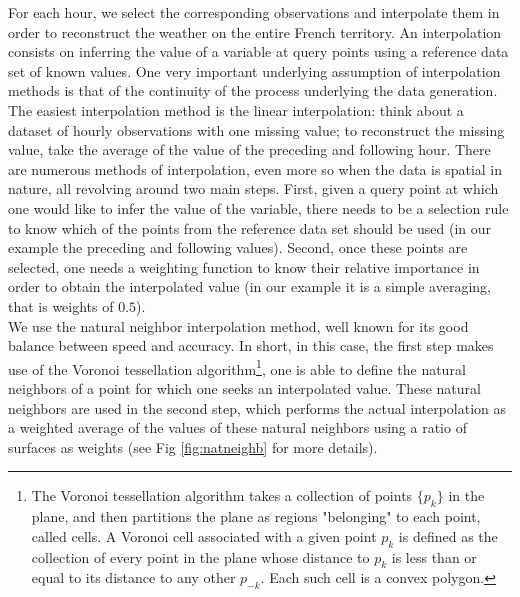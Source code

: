 For each hour, we select the corresponding observations and interpolate them in order to reconstruct the weather on the entire French territory. An interpolation consists on inferring the value of a variable at query points using a reference data set of known values. One very important underlying assumption of interpolation methods is that of the continuity of the process underlying the data generation. The easiest interpolation method is the linear interpolation: think about a dataset of hourly observations with one missing value; to reconstruct the missing value, take the average of the value of the preceding and following hour. There are numerous methods of interpolation, even more so when the data is spatial in nature, all revolving around two main steps. First, given a query point at which one would like to infer the value of the variable, there needs to be a selection rule to know which of the points from the reference data set should be used (in our example the preceding and following values). Second, once these points are selected, one needs a weighting function to know their relative importance in order to obtain the interpolated value (in our example it is a simple averaging, that is weights of $0.5$). \\

We use the natural neighbor interpolation method, well known for its good balance between speed and accuracy. In short, in this case, the first step makes use of the Voronoi tessellation algorithm\footnote{The Voronoi tessellation algorithm takes a collection of points $\{p_k\}$ in the plane, and then partitions the plane as regions "belonging" to each point, called cells. A Voronoi cell associated with a given point $p_k$ is defined as the collection of every point in the plane whose distance to $p_k$ is less than or equal to its distance to any other $p_{-k}$. Each such cell is a convex polygon.}, one is able to define the natural neighbors of a point for which one seeks an interpolated value. These natural neighbors are used in the second step, which performs the actual interpolation as a weighted average of the values of these natural neighbors using a ratio of surfaces as weights (see Fig \ref{fig:natneighb} for more details).


